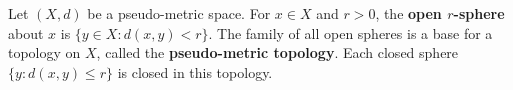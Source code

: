 Let $(X,d)$ be a pseudo-metric space. For $x \in X$ and $r > 0$, the \textbf{open $r$-sphere} about $x$ is $\{y \in X : d(x,y) < r\}$. The family of all open spheres is a base for a topology on $X$, called the \textbf{pseudo-metric topology}. Each closed sphere $\{y : d(x,y) \leq r\}$ is closed in this topology.
